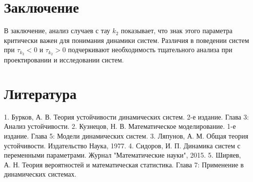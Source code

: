 \documentclass[a4paper]{article}
\begin{document}
\section{Заключение}

В заключение, анализ случаев с тау \( k_2 \) показывает, что знак этого параметра критически важен для понимания динамики систем. Различия в поведении систем при \( \tau_{k_2} < 0 \) и \( \tau_{k_2} > 0 \) подчеркивают необходимость тщательного анализа при проектировании и исследовании систем.

\section{Литература}

1. Бурков, А. В. Теория устойчивости динамических систем. 2-е издание. Глава 3: Анализ устойчивости.  
2. Кузнецов, Н. В. Математическое моделирование. 1-е издание. Глава 5: Модели динамических систем.  
3. Ляпунов, А. М. Общая теория устойчивости. Издательство Наука, 1977.  
4. Сидоров, И. П. Динамика систем с переменными параметрами. Журнал "Математические науки", 2015.  
5. Ширяев, А. Н. Теория вероятностей и математическая статистика. Глава 7: Применение в динамических системах.  
\end{document}
